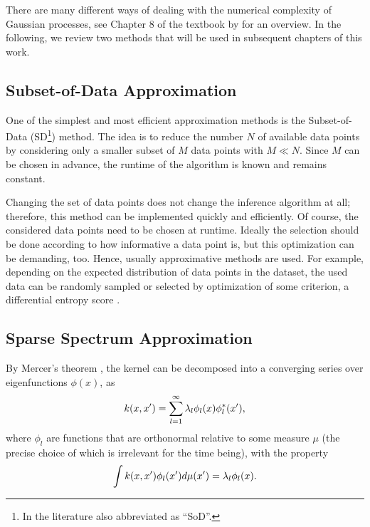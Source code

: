 There are many different ways of dealing with the numerical complexity of
Gaussian processes, see Chapter 8 of the textbook by
\textcite{Rasmussen.Williams:2006:Gaussian} for an overview. In the following,
we review two methods that will be used in subsequent chapters of this
work.

\subsection{Subset-of-Data Approximation}
\label{sec:subset-of-data}

One of the simplest and most efficient approximation methods is the
Subset-of-Data (SD\footnote{In the literature also abbreviated as ``SoD''.})
method. The idea is to reduce the number $N$ of available data points by
considering only a smaller subset of $M$ data points with $M \ll N$. Since $M$
can be chosen in advance, the runtime of the algorithm is known and remains
constant.

Changing the set of data points does not change the inference algorithm at all;
therefore, this method can be implemented quickly and efficiently. Of course,
the considered data points need to be chosen at runtime. Ideally the selection
should be done according to how informative a data point is, but this
optimization can be demanding, too. Hence, usually approximative methods are
used. For example, depending on the expected distribution of data points in the
dataset, the used data can be randomly sampled or selected by optimization of
some criterion, \eg a differential entropy score
\cite{Lawrence.ea:2003:Fast}.

\subsection{Sparse Spectrum Approximation}
\label{sec:sparse-spectrum-approximation}

By Mercer's theorem \cite[\ts3.a]{Konig:1986:Eigenvalue}, the kernel can be
decomposed into a converging series over eigenfunctions $\phi(x)$, as
\begin{equation}
  \label{eq:mercer}
  \k(x,x') = \sum_{l=1} ^\infty \lambda_l \phi _l(x) \phi_l ^*
(x'),
\end{equation}
where $\phi_l$ are functions that are orthonormal relative to some measure $\mu$
(the precise choice of which is irrelevant for the time being), with the
property
\begin{equation}
  \int k(x,x') \phi_l(x') d\mu(x') = \lambda_l \phi_l(x).
\end{equation}

